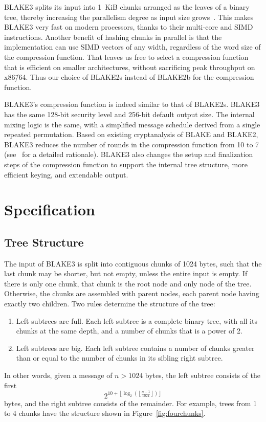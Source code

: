 \documentclass[11pt,notitlepage,a4paper]{article}
\begin{document}
BLAKE3 splits its input into 1~KiB chunks arranged as the leaves of a
binary tree, thereby increasing the parallelism degree as input size
grows~\cite{DBLP:journals/tosc/AtighehchiB17,DBLP:journals/tc/AtighehchiR17}.
This makes BLAKE3 very fast on modern processors, thanks to their
multi-core and SIMD instructions.
Another benefit of hashing chunks in parallel is that the implementation
can use SIMD vectors of any width, regardless of the word size of the
compression function. That leaves us free to select a compression
function that is efficient on smaller architectures, without sacrificing
peak throughput on x86\=/64. Thus our choice of BLAKE2s instead of
BLAKE2b for the compression function.

BLAKE3's compression function is indeed similar to that of BLAKE2s. BLAKE3 has
the same 128-bit security level and 256-bit default output size. The internal
mixing logic is the same, with a simplified message schedule derived from a
single repeated permutation. Based on existing cryptanalysis of BLAKE and
BLAKE2, BLAKE3 reduces the number of rounds in the compression function from 10
to 7 (see~\cite{TMC} for a detailed rationale). BLAKE3 also changes the setup
and finalization steps of the compression function to support the internal tree
structure, more efficient keying, and extendable output.

\section{Specification}\label{sec:specification}

\subsection{Tree Structure}\label{sec:tree}

The input of BLAKE3 is split into contiguous chunks  of 1024 bytes, such
that the last chunk may be shorter, but not empty, unless the entire input is empty. 
If there is only one chunk, that chunk
is the root node and only node of the tree. 
Otherwise, the chunks are assembled with parent nodes, each parent node having exactly two children. 
Two rules determine the structure of the tree:
\begin{enumerate}
    \item Left subtrees are full. Each left subtree is a complete binary tree,
        with all its chunks at the same depth, and a number of chunks that is a
        power of 2.
    \item Left subtrees are big. Each left subtree contains a number of chunks
        greater than or equal to the number of chunks in its sibling right
        subtree.
\end{enumerate}
In other words, given a message of $n > 1024$ bytes, the left subtree consists
of the first $$2^{10 + \left\lfloor \log_2 \left(\left\lfloor \frac{n-1}{1024}
\right\rfloor\right) \right\rfloor}$$ bytes, and the right subtree consists of
the remainder. For example, trees from 1 to 4 chunks have the structure shown
in Figure~\ref{fig:fourchunks}.
\end{document}
